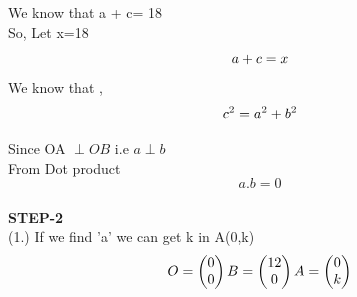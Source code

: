 \documentclass[10pt,a4paper]{report}
\begin{document}
\begin{multicols}{2}
\vspace{3mm} 
We know that a + c= 18 \vspace{2mm}\\
So, Let x=18 
\begin{equation}
   a +c = x \vspace{2mm}
\end{equation}
We know that , \\
\begin{equation}
c^2 = a^2 + b^2 \vspace{2mm}
\end{equation}

Since OA $\perp OB$  i.e  $a \perp b$ \\\vspace{3mm}
From Dot product \\
\begin{equation}
a.b = 0 
\end{equation}\vspace{2mm}\\

\textbf{STEP-2}\vspace{2mm}\\
(1.) If we find 'a' we can get k in A(0,k) \\\vspace{2mm}
\begin{equation}
    O=\begin{pmatrix}
0\\
0
\end{pmatrix} 
    B=\begin{pmatrix}
12\\
0
\end{pmatrix} 
    A=\begin{pmatrix}
0\\
k
 \end{pmatrix}  \vspace{3mm}
\end{equation}
  

\end{multicols}
\end{document}

